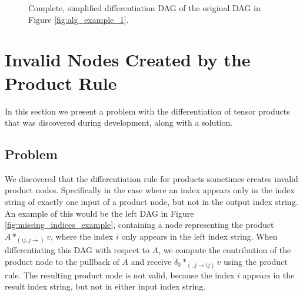 \documentclass[12pt, a4paper]{report} %
\begin{document}
\begin{figure}
    \centering
    \caption[Simplified Differentiation DAG in Example of Multiple Pullback Contributions]{Complete, simplified differentiation DAG of the original DAG in Figure \ref{fig:alg_example_1}.}
    \label{fig:alg_example_3}
\end{figure}

\FloatBarrier
\section{Invalid Nodes Created by the Product Rule}
In this section we present a problem with the differentiation of tensor products that was discovered during development, along with a solution.

\subsection{Problem}
We discovered that the differentiation rule for products sometimes creates invalid product nodes.
Specifically in the case where an index appears only in the index string of exactly one input of a product node, but not in the output index string.
An example of this would be the left DAG in Figure \ref{fig:missing_indices_example}, containing a node representing the product $A *_{(ij,j \rightarrow )} v$, where the index $i$ only appears in the left index string.
When differentiating this DAG with respect to $A$, we compute the contribution of the product node to the pullback of $A$ and receive $\delta_0 *_{(,j \rightarrow ij)} v$ using the product rule.
The resulting product node is not valid, because the index $i$ appears in the result index string, but not in either input index string.
\end{document}

